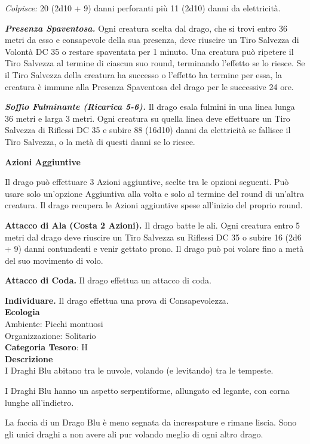 \begin{multicols}{2}
{\emph{Colpisce:} 20 (2d10 + 9) danni perforanti più 11 (2d10) danni da elettricità.

\emph{\textbf{Presenza Spaventosa.}} Ogni creatura scelta dal drago, che si trovi entro 36 metri da esso e consapevole della sua presenza, deve riuscire un Tiro Salvezza di Volontà DC 35 o restare spaventata per 1 minuto. Una creatura può ripetere il Tiro Salvezza al termine di ciascun suo round, terminando l'effetto se lo riesce. Se il Tiro Salvezza della creatura ha successo o l'effetto ha termine per essa, la creatura è immune alla Presenza Spaventosa del drago per le successive 24 ore.

\emph{\textbf{Soffio Fulminante (Ricarica 5-6).}} Il drago esala fulmini in una linea lunga 36 metri e larga 3 metri. Ogni creatura su quella linea deve effettuare un Tiro Salvezza di Riflessi DC 35 e subire 88 (16d10) danni da elettricità se fallisce il Tiro Salvezza, o la metà di questi danni se lo riesce.

\textbf{Azioni Aggiuntive}

Il drago può effettuare 3 Azioni aggiuntive, scelte tra le opzioni seguenti. Può usare solo un'opzione Aggiuntiva alla volta e solo al termine del round di un'altra creatura. Il drago recupera le Azioni aggiuntive spese all'inizio del proprio round.

\textbf{Attacco di Ala (Costa 2 Azioni).} Il drago batte le ali. Ogni creatura entro 5 metri dal drago deve riuscire un Tiro Salvezza su Riflessi DC 35 o subire 16 (2d6 + 9) danni contundenti e venir gettato prono. Il drago può poi volare fino a metà del suo movimento di volo.

\textbf{Attacco di Coda.} Il drago effettua un attacco di coda.

\textbf{Individuare.} Il drago effettua una prova di Consapevolezza.\\
\textbf{Ecologia}\\
Ambiente: Picchi montuosi\\
Organizzazione: Solitario\\
\textbf{Categoria Tesoro}: H\\
\textbf{Descrizione}\\
I Draghi Blu abitano tra le nuvole, volando (e levitando) tra le tempeste.

I Draghi Blu hanno un aspetto serpentiforme, allungato ed legante, con corna lunghe all'indietro.

La faccia di un Drago Blu è meno segnata da increspature e rimane liscia.
Sono gli unici draghi a non avere ali pur volando meglio di ogni altro drago.

}
\end{multicols}
